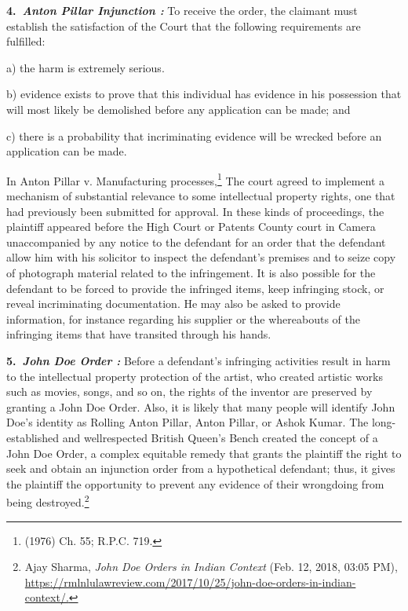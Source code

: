 \begin{multicols}{2}
\noi
{\large \bfseries 4.~\textit{Anton Pillar Injunction :}} To receive the order, the claimant must establish the
satisfaction of the Court that the following requirements are fulfilled:

\vspace{-.15cm}

\noi
a) the harm is extremely serious.

\noi
b) evidence exists to prove that this individual has evidence in his possession that will
most likely be demolished before any application can be made; and

\noi
c) there is a probability that incriminating evidence will be wrecked before an
application can be made.

\noi
In Anton Pillar v. Manufacturing processes,\footnote{(1976) Ch. 55; R.P.C. 719.} The court agreed to implement a
mechanism of substantial relevance to some intellectual property rights, one that had
previously been submitted for approval. In these kinds of proceedings, the plaintiff
appeared before the High Court or Patents County court in Camera unaccompanied by
any notice to the defendant for an order that the defendant allow him with his solicitor
to inspect the defendant's premises and to seize copy of photograph material related to
the infringement. It is also possible for the defendant to be forced to provide the
infringed items, keep infringing stock, or reveal incriminating documentation. He may
also be asked to provide information, for instance regarding his supplier or the
whereabouts of the infringing items that have transited through his hands.

\noi
{\large \bfseries 5.~\textit{John Doe Order :}} Before a defendant's infringing activities result in harm to the
intellectual property protection of the artist, who created artistic works such as movies, songs, and so on, the rights of the inventor are preserved by granting a John
Doe Order. Also, it is likely that many people will identify John Doe's identity as
Rolling Anton Pillar, Anton Pillar, or Ashok Kumar. The long-established and wellrespected British Queen's Bench created the concept of a John Doe Order, a complex
equitable remedy that grants the plaintiff the right to seek and obtain an injunction
order from a hypothetical defendant; thus, it gives the plaintiff the opportunity to
prevent any evidence of their wrongdoing from being destroyed.\footnote{Ajay Sharma, \textit{John Doe Orders in Indian Context} (Feb. 12, 2018, 03:05 PM), \url{https://rmlnlulawreview.com/2017/10/25/john-doe-orders-in-indian-context/.}}


\end{multicols}
